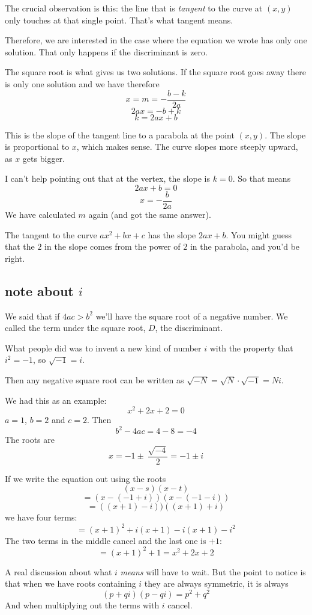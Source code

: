 \documentclass[11pt, oneside]{article}
\begin{document}
The crucial observation is this:  the line that is \emph{tangent} to the curve at $(x,y)$ only touches at that single point.  That's what tangent means.

Therefore, we are interested in the case where the equation we wrote has only one solution.  That only happens if the discriminant is zero.

The square root is what gives us two solutions.  If the square root goes away there is only one solution and we have therefore
\[ x = m = -\frac{b - k}{2a} \]
\[ 2ax = - b + k \]
\[ k = 2ax + b \]

This is the slope of the tangent line to a parabola at the point $(x,y)$.  The slope is proportional to $x$, which makes sense.  The curve slopes more steeply upward, as $x$ gets bigger.

I can't help pointing out that at the vertex, the slope is $k = 0$.  So that means
\[ 2ax + b = 0 \]
\[ x = - \frac{b}{2a} \]
We have calculated $m$ again (and got the same answer).

The tangent to the curve $ax^2 + bx + c$ has the slope $2ax + b$.  You might guess that the $2$ in the slope comes from the power of $2$ in the parabola, and you'd be right.

\subsection*{note about $i$}
We said that if $4ac > b^2$ we'll have the square root of a negative number.  We called the term under the square root, $D$, the discriminant.

What people did was to invent a new kind of number $i$ with the property that $i^2 = -1$, so $\sqrt{-1} = i$.

Then any negative square root can be written as $\sqrt{-N} = \sqrt{N} \cdot \sqrt{-1} = Ni$.

We had this as an example:  
\[ x^2 + 2x + 2 = 0 \]
$a = 1$, $b = 2$ and $c = 2$.  Then
\[ b^2 - 4ac = 4 - 8 = -4 \]
The roots are
\[ x = -1 \pm \ \frac{\sqrt{-4}}{2} = -1 \pm i \]

If we write the equation out using the roots
\[ (x - s)(x - t) \]
\[ = (x - (- 1 + i))(x - (-1 - i)) \]
\[ = ((x + 1) - i))((x + 1) + i) \]
we have four terms:
\[ = (x + 1)^2 + i (x+1) - i (x+1) - i^2 \]
The two terms in the middle cancel and the last one is $+1$:
\[ = (x + 1)^2 + 1 = x^2 + 2x + 2 \]

A real discussion about what $i$ \emph{means} will have to wait.  But the point to notice is that when we have roots containing $i$ they are always symmetric, it is always
\[ (p + qi)(p - qi) = p^2 + q^2 \]
And when multiplying out the terms with $i$ cancel.
\end{document}
